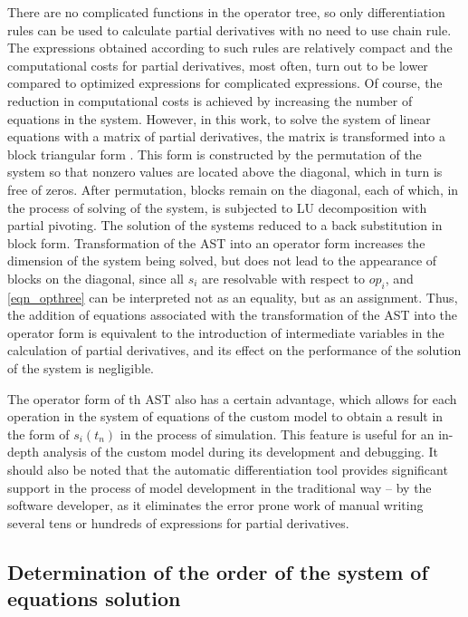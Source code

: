 \documentclass[lettersize,journal]{IEEEtran}
\begin{document}
There are no complicated functions in the operator tree, so only differentiation rules can be used to calculate partial derivatives with no need
to use chain rule. The expressions obtained according to such rules are relatively compact and the computational costs for partial
derivatives, most often, turn out to be lower compared to optimized expressions for complicated expressions. Of course, the reduction in 
computational costs is achieved by increasing the number of equations in the system. However, in this work, to solve the system of linear equations
with a matrix of partial derivatives, the matrix is transformed into a block triangular form \cite{texbook}. This form is constructed by  
the permutation of the system so that nonzero values are located above the diagonal, which in turn is free of zeros. 
After permutation, blocks remain on the diagonal, each of which, in the process of solving of the system, is subjected to LU decomposition 
with partial pivoting. The solution of the systems reduced to a back substitution in block form. Transformation of the AST into an operator form 
increases the dimension of the system being solved, but does not lead to the appearance of blocks on the diagonal, since all \(s_i\) are 
resolvable with respect to \(op_i\), and \eqref{eqn_opthree} can be interpreted not as an equality, but as an assignment. Thus, the addition 
of equations associated with the transformation of the AST into the operator form is equivalent to the introduction of intermediate variables in the
calculation of partial derivatives, and its effect on the performance of the solution of the system is negligible.

The operator form of th AST also has a certain advantage, which allows for each operation in the system of equations of the custom model to 
obtain a result in the form of \(s_i (t_n)\) in the process of simulation. This feature is useful for an in-depth analysis of the custom model 
during its development and debugging. It should also be noted that the automatic differentiation tool provides significant support 
in the process of model development in the traditional way -- by the software developer, as it eliminates the error prone work of manual writing 
several tens or hundreds of expressions for partial derivatives.

\subsection{Determination of the order of the system of equations solution} 
\end{document}

